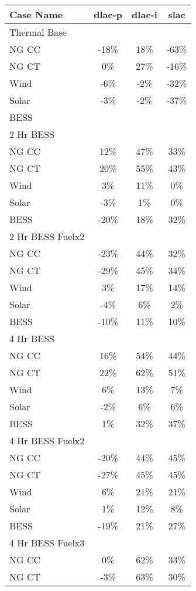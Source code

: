 \begin{table*}[htbp]
\centering
\begin{tabular}{lccc}
\toprule
Case Name & dlac-p & dlac-i & slac \\
\midrule
Thermal Base \\
\quad NG CC & -18\% & 18\% & -63\% \\
\quad NG CT & 0\% & 27\% & -16\% \\
\quad Wind & -6\% & -2\% & -32\% \\
\quad Solar & -3\% & -2\% & -37\% \\
\quad BESS &  \\
\midrule
2 Hr BESS \\
\quad NG CC & 12\% & 47\% & 33\% \\
\quad NG CT & 20\% & 55\% & 43\% \\
\quad Wind & 3\% & 11\% & 0\% \\
\quad Solar & -3\% & 1\% & 0\% \\
\quad BESS & -20\% & 18\% & 32\% \\
\midrule
2 Hr BESS Fuelx2 \\
\quad NG CC & -23\% & 44\% & 32\% \\
\quad NG CT & -29\% & 45\% & 34\% \\
\quad Wind & 3\% & 17\% & 14\% \\
\quad Solar & -4\% & 6\% & 2\% \\
\quad BESS & -10\% & 11\% & 10\% \\
\midrule
4 Hr BESS \\
\quad NG CC & 16\% & 54\% & 44\% \\
\quad NG CT & 22\% & 62\% & 51\% \\
\quad Wind & 6\% & 13\% & 7\% \\
\quad Solar & -2\% & 6\% & 6\% \\
\quad BESS & 1\% & 32\% & 37\% \\
\midrule
4 Hr BESS Fuelx2 \\
\quad NG CC & -20\% & 44\% & 45\% \\
\quad NG CT & -27\% & 45\% & 45\% \\
\quad Wind & 6\% & 21\% & 21\% \\
\quad Solar & 1\% & 12\% & 8\% \\
\quad BESS & -19\% & 21\% & 27\% \\
\midrule
4 Hr BESS Fuelx3 \\
\quad NG CC & 0\% & 62\% & 33\% \\
\quad NG CT & -3\% & 63\% & 30\% \\

\end{tabular}
\end{table*}
